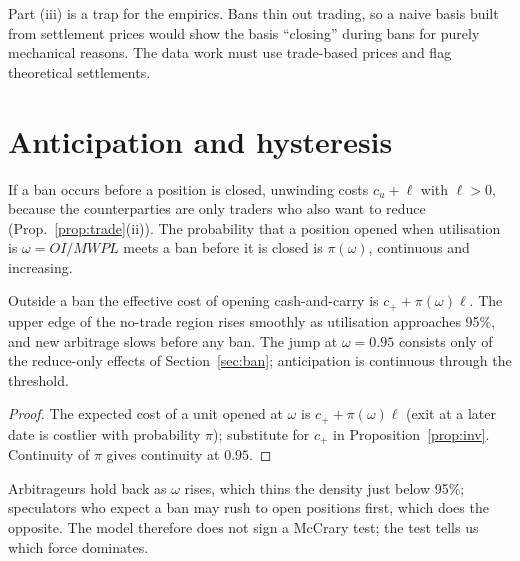 \begin{remark}
Part (iii) is a trap for the empirics. Bans thin out trading, so a naive basis built from settlement prices would show the
basis ``closing'' during bans for purely mechanical reasons. The data work must use trade-based prices and flag
theoretical settlements.
\end{remark}

\section{Anticipation and hysteresis}\label{sec:antic}
\begin{assumption}\label{as:exit}
If a ban occurs before a position is closed, unwinding costs $c_u+\ell$ with $\ell>0$, because the counterparties are only
traders who also want to reduce (Prop.~\ref{prop:trade}(ii)). The probability that a position opened when utilisation is
$\omega=OI/MWPL$ meets a ban before it is closed is $\pi(\omega)$, continuous and increasing.
\end{assumption}

\begin{proposition}[Anticipation]\label{prop:antic}
Outside a ban the effective cost of opening cash-and-carry is $c_+ + \pi(\omega)\ell$. The upper edge of the no-trade
region rises smoothly as utilisation approaches 95\%, and new arbitrage slows before any ban. The jump at $\omega=0.95$
consists only of the reduce-only effects of Section~\ref{sec:ban}; anticipation is continuous through the threshold.
\end{proposition}
\begin{proof}
The expected cost of a unit opened at $\omega$ is $c_++\pi(\omega)\ell$ (exit at a later date is costlier with probability
$\pi$); substitute for $c_+$ in Proposition~\ref{prop:inv}. Continuity of $\pi$ gives continuity at $0.95$.
\end{proof}

\begin{remark}
Arbitrageurs hold back as $\omega$ rises, which thins the density just below 95\%; speculators who expect a ban may rush to
open positions first, which does the opposite. The model therefore does not sign a McCrary test; the test tells us which
force dominates.
\end{remark}

